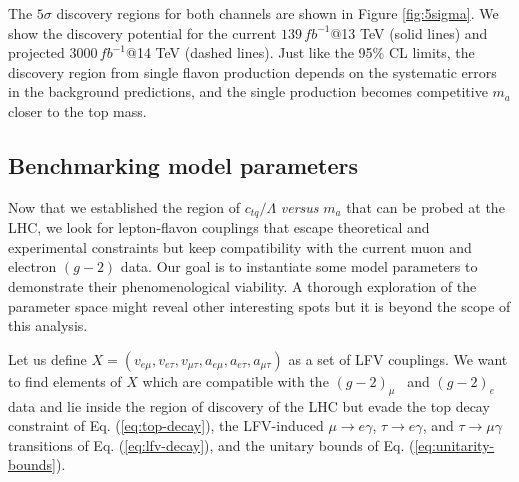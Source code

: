 \documentclass[prd,amsfonts,onecolumn,superscriptaddress,aps,nofootinbib,11pt]{revtex4-1}
\begin{document}
The $5\sigma$ discovery regions for both channels are shown in Figure \ref{fig:5sigma}. We show the discovery potential for the current $139 \, \si{fb^{-1}}$@13 TeV (solid lines) and projected $3000 \, \si{fb^{-1}}$@14 TeV (dashed lines). Just like the 95\% CL limits, the discovery region from single flavon production depends on the systematic errors in the background predictions, and the single production becomes competitive $m_a$ closer to the top mass.


\subsection{Benchmarking model parameters}

 Now that we established the region of $c_{tq}/\Lambda$ {\it versus} $m_a$ that can be probed at the LHC, we look for lepton-flavon couplings that escape theoretical and experimental constraints but keep compatibility with the current muon and electron $(g-2)$ data. Our goal is to instantiate some model parameters to demonstrate their phenomenological viability. A thorough exploration of the parameter space might reveal other interesting spots but it is beyond the scope of this analysis.


Let us define $X = ( v_{e \mu}, v_{e \tau}, v_{\mu \tau}, a_{e \mu}, a_{e \tau}, a_{\mu \tau} )$ as a set of LFV couplings. We want to find elements of $X$ which are compatible with the $(g-2)_\mu$~\cite{Muong-2:2006rrc,Muong-2:2015xgu} and $(g-2)_e$~\cite{Hanneke_2008,Hanneke:2010au} data and lie inside the region of discovery of the LHC but evade the top decay constraint of Eq. (\ref{eq:top-decay}), the LFV-induced $\mu\to e\gamma$, $\tau\to e\gamma$, and $\tau\to \mu\gamma$  transitions of Eq. (\ref{eq:lfv-decay}), and the unitary bounds of Eq. (\ref{eq:unitarity-bounds}). 
\end{document}
